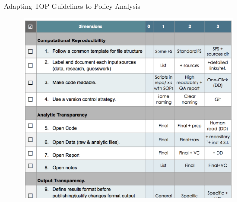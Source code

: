 \documentclass{beamer}
\begin{document}

\begin{frame}{Adapting TOP Guidelines to Policy Analysis}

\begin{figure}[h!]
\centering
\hspace*{-3em}
\includegraphics[scale = 0.24]{../Images/PA_guidelines}
\label{pol_est}
\end{figure}	
\end{frame}
\end{document}
